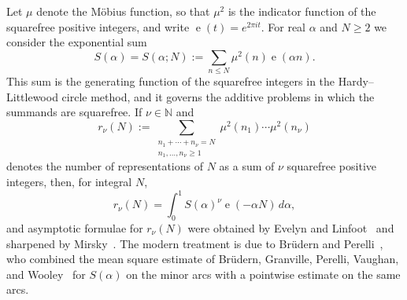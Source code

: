 \documentclass[11pt]{amsart}
\numberwithin{equation}{section}
\numberwithin{figure}{section}
\theoremstyle{definition}
\newcommand{\N}{\mathbb{N}}
\newcommand{\e}{\operatorname{e}}
\begin{document}
Let $\mu$ denote the M\"obius function, so that $\mu^2$ is the indicator
function of the squarefree positive integers, and write $\e(t)=e^{2\pi it}$.
For real $\alpha$ and $N\ge2$ we consider the exponential sum
\begin{equation}\label{eq:S-def}
  S(\alpha)=S(\alpha;N):=\sum_{n\le N}\mu^2(n)\e(\alpha n).
\end{equation}
This sum is the generating function of the squarefree integers in the
Hardy--Littlewood circle method, and it governs the additive problems in
which the summands are squarefree.  If $\nu\in\N$ and
\begin{equation}\label{eq:r-def}
  r_\nu(N):=\sum_{\substack{n_1+\cdots+n_\nu=N\\ n_1,\ldots,n_\nu\ge1}}
  \mu^2(n_1)\cdots\mu^2(n_\nu)
\end{equation}
denotes the number of representations of $N$ as a sum of $\nu$ squarefree
positive integers, then, for integral $N$,
\begin{equation}\label{eq:orthogonality}
  r_\nu(N)=\int_0^1S(\alpha)^\nu\e(-\alpha N)\,d\alpha,
\end{equation}
and asymptotic
formulae for $r_\nu(N)$ were obtained by Evelyn and Linfoot~\cite{EL} and
sharpened by Mirsky~\cite{Mirsky}.  The modern treatment is due to
Br\"udern and Perelli~\cite{BP}, who combined the mean square estimate of
Br\"udern, Granville, Perelli, Vaughan, and Wooley~\cite{BGPVW} for
$S(\alpha)$ on the minor arcs with a pointwise estimate on the same arcs.
\end{document}
